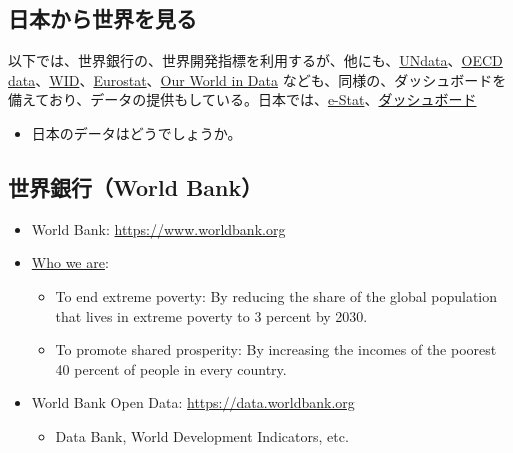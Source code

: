 \documentclass[
]{bxjsbook}
\providecommand{\tightlist}{%
  \setlength{\itemsep}{0pt}\setlength{\parskip}{0pt}}
\theoremstyle{definition}
\theoremstyle{definition}
\theoremstyle{definition}
\theoremstyle{definition}
\theoremstyle{remark}
\begin{document}
\hypertarget{ux65e5ux672cux304bux3089ux4e16ux754cux3092ux898bux308b}{%
\subsection{日本から世界を見る}\label{ux65e5ux672cux304bux3089ux4e16ux754cux3092ux898bux308b}}

以下では、世界銀行の、世界開発指標を利用するが、他にも、\href{https://data.un.org}{UNdata}、\href{https://data.oecd.org}{OECD data}、\href{https://wid.world}{WID}、\href{https://ec.europa.eu/eurostat}{Eurostat}、\href{https://ourworldindata.org}{Our World in Data} なども、同様の、ダッシュボードを備えており、データの提供もしている。日本では、\href{https://www.e-stat.go.jp/}{e-Stat}、\href{https://dashboard.e-stat.go.jp}{ダッシュボード}

\begin{itemize}
\tightlist
\item
  日本のデータはどうでしょうか。
\end{itemize}

\hypertarget{ux4e16ux754cux9280ux884cworld-bank}{%
\subsection{世界銀行（World Bank）}\label{ux4e16ux754cux9280ux884cworld-bank}}

\begin{itemize}
\tightlist
\item
  World Bank: \url{https://www.worldbank.org}
\item
  \href{https://www.worldbank.org/en/who-we-are}{Who we are}:

  \begin{itemize}
  \tightlist
  \item
    To end extreme poverty: By reducing the share of the global population that lives in extreme poverty to 3 percent by 2030.
  \item
    To promote shared prosperity: By increasing the incomes of the poorest 40 percent of people in every country.
  \end{itemize}
\item
  World Bank Open Data: \url{https://data.worldbank.org}

  \begin{itemize}
  \tightlist
  \item
    Data Bank, World Development Indicators, etc.
  \end{itemize}
\end{itemize}
\end{document}
